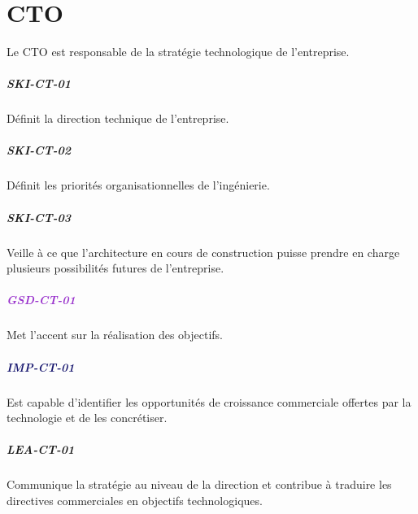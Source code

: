 \documentclass[a4paper, french, openany, 12pt]{book}
\newcommand\dex[1]{\textcolor{BrickRed}{\textbf{\uppercase{ski-{#1}}}}}
\newcommand\str[1]{\textcolor{DarkOrchid}{\textbf{\uppercase{gsd-{#1}}}}}
\newcommand\wis[1]{\textcolor{MidnightBlue}{\textbf{\uppercase{imp-{#1}}}}}
\newcommand\cha[1]{\textcolor{OliveGreen}{\textbf{\uppercase{lea-{#1}}}}}
\begin{document}
\chapter{CTO}

Le CTO est responsable de la stratégie technologique de l’entreprise.

\begin{multicols}{2}

  \paragraph*{\dex{ct-01}}

  Définit la direction technique de l'entreprise.

  \paragraph*{\dex{ct-02}}

  Définit les priorités organisationnelles de l'ingénierie.

  \paragraph*{\dex{ct-03}}

  Veille à ce que l'architecture en cours de construction puisse prendre en charge plusieurs possibilités futures de 
  l'entreprise.

  \paragraph*{\str{ct-01}}

  Met l'accent sur la réalisation des objectifs.

  \paragraph*{\wis{ct-01}}

  Est capable d'identifier les opportunités de croissance commerciale offertes par la technologie et de les concrétiser.

  \paragraph*{\cha{ct-01}}

  Communique la stratégie au niveau de la direction et contribue à traduire les directives commerciales en objectifs 
  technologiques.

\end{multicols}
\end{document}
